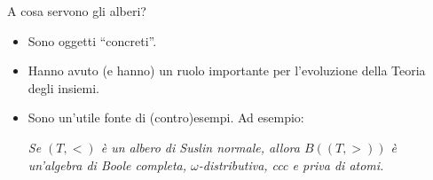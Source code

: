 \documentclass{beamer}
\theoremstyle{num.custom-title}
\theoremstyle{custom-title}
\begin{document}
\begin{frame}{A cosa servono gli alberi?}

\begin{itemize}
\item Sono oggetti ``concreti''.
\item Hanno avuto (e hanno) un ruolo importante per l'evoluzione della Teoria degli insiemi.
\item Sono un'utile fonte di (contro)esempi. Ad esempio:
\begin{center}
\textit{Se $(T,<)$ è un albero di Suslin normale, allora $B((T,>))$ è un'algebra di Boole completa, $\omega$-distributiva, ccc e priva di atomi.}
\end{center}
\end{itemize}

\end{frame}
\end{document}
